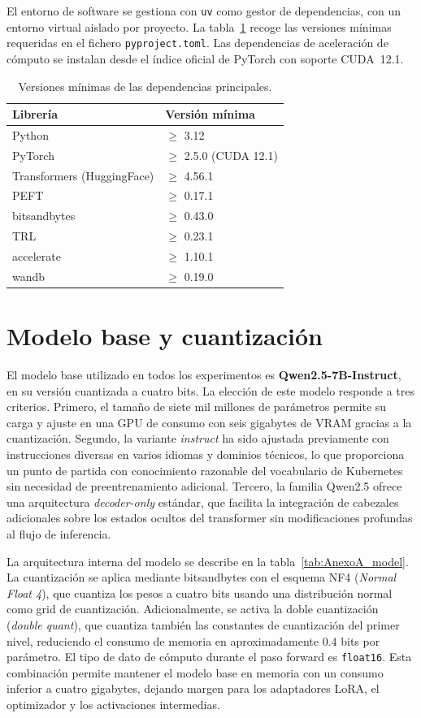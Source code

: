 El entorno de software se gestiona con \texttt{uv} como gestor de dependencias, con un entorno virtual aislado por proyecto. La tabla~\ref{tab:AnexoA_software} recoge las versiones
mínimas requeridas en el fichero \texttt{pyproject.toml}. Las dependencias de aceleración de cómputo se instalan desde el índice oficial de PyTorch con soporte CUDA~12.1.

\begin{table}[htbp]
\centering
\caption{Versiones mínimas de las dependencias principales.}
\label{tab:AnexoA_software}
\begin{tabular}{ll}
\toprule
\textbf{Librería} & \textbf{Versión mínima} \\
\midrule
Python & $\geq$ 3.12 \\
PyTorch & $\geq$ 2.5.0 (CUDA 12.1) \\
Transformers (HuggingFace) & $\geq$ 4.56.1 \\
PEFT & $\geq$ 0.17.1 \\
bitsandbytes & $\geq$ 0.43.0 \\
TRL & $\geq$ 0.23.1 \\
accelerate & $\geq$ 1.10.1 \\
wandb & $\geq$ 0.19.0 \\
\bottomrule
\end{tabular}
\end{table}

\section{Modelo base y cuantización}

El modelo base utilizado en todos los experimentos es \textbf{Qwen2.5-7B-Instruct}, en su versión cuantizada a cuatro bits. La elección de este modelo responde a tres criterios.
Primero, el tamaño de siete mil millones de parámetros permite su carga y ajuste en una GPU de consumo con seis gigabytes de VRAM gracias a la cuantización. Segundo, la variante
\textit{instruct} ha sido ajustada previamente con instrucciones diversas en varios idiomas y dominios técnicos, lo que proporciona un punto de partida con conocimiento razonable 
del vocabulario de Kubernetes sin necesidad de preentrenamiento adicional. Tercero, la familia Qwen2.5 ofrece una arquitectura \textit{decoder-only} estándar, que facilita la
integración de cabezales adicionales sobre los estados ocultos del transformer sin modificaciones profundas al flujo de inferencia.

La arquitectura interna del modelo se describe en la tabla~\ref{tab:AnexoA_model}. La cuantización se aplica mediante bitsandbytes con el esquema NF4 (\textit{Normal Float 4}),
que cuantiza los pesos a cuatro bits usando una distribución normal como grid de cuantización. Adicionalmente, se activa la doble cuantización (\textit{double quant}), que cuantiza
también las constantes de cuantización del primer nivel, reduciendo el consumo de memoria en aproximadamente 0.4 bits por parámetro. El tipo de dato de cómputo durante el paso
forward es \texttt{float16}. Esta combinación permite mantener el modelo base en memoria con un consumo inferior a cuatro gigabytes, dejando margen para los adaptadores LoRA, el
optimizador y los activaciones intermedias.

